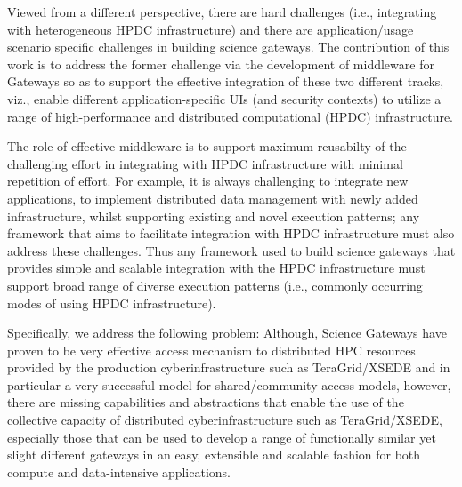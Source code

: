\documentclass[]{svjour3}
\begin{document}
Viewed from a different perspective, there are hard challenges (i.e.,
integrating with heterogeneous HPDC infrastructure) and there are
application/usage scenario specific challenges in building science gateways. The
contribution of this work is to address the former challenge via the
development of middleware for Gateways so as to support the effective
integration of these two different tracks, viz., enable different
application-specific UIs (and security contexts) to utilize a range of
high-performance and distributed computational (HPDC) infrastructure.

The role of effective middleware is to support maximum reusabilty of
the challenging effort in integrating with HPDC infrastructure with
minimal repetition of effort.  For example, it is always challenging
to integrate new applications, to implement distributed data
management with newly added infrastructure, whilst supporting existing
and novel execution patterns; any framework that aims to facilitate
integration with HPDC infrastructure must also address these
challenges.  Thus any framework used to build science gateways that provides simple
and scalable integration with the HPDC infrastructure must support
broad range of diverse execution patterns (i.e., commonly occurring
modes of using HPDC infrastructure).

Specifically, we address the following problem: Although, Science
Gateways have proven to be very effective access mechanism to
distributed HPC resources provided by the production
cyberinfrastructure such as TeraGrid/XSEDE and in particular a very
successful model for shared/community access models, however, there
are missing capabilities and abstractions that enable the use of the
collective capacity of distributed cyberinfrastructure such as
TeraGrid/XSEDE, especially those that can be used to develop a range
of functionally similar yet slight different gateways in an easy,
extensible and scalable fashion for both compute and data-intensive
applications.



\end{document}
